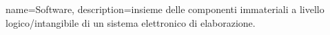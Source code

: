 {
	name={Software},
	description={insieme delle componenti immateriali a livello logico/intangibile di un sistema elettronico di elaborazione.}
}